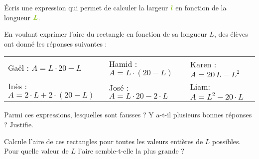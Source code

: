 \begin{activite}
\begin{partie}
Écris une expression qui permet de calculer la largeur $\emph{\textbf{\textcolor{H1}{l}}}$ en fonction de la longueur $\emph{\textbf{\textcolor{H1}{L}}}$.
\end{partie}

\begin{partie}
En voulant exprimer l'aire du rectangle en fonction de sa longueur $L$, des élèves ont donné les réponses suivantes :
\begin{center}
 \begin{tabularx}{1.1\linewidth}{X|X|X}
  Gaël : $A = L \cdot 20 - L$ & Hamid : $A = L \cdot (20 - L)$ & Karen : $A = 20\,L - L^2$ \\
  Inès : $A = 2 \cdot L + 2 \cdot (20 - L)$ & José : $A = L \cdot 20 - 2 \cdot L$ & Liam: $A = L^2 - 20 \cdot L$ \\
  \end{tabularx}   
 \end{center}
 \vspace{0.3cm}
Parmi ces expressions, lesquelles sont fausses ? Y a-t-il plusieurs bonnes réponses ? Justifie.
\end{partie}

\begin{partie}
Calcule l'aire de ces rectangles pour toutes les valeurs entières de $L$ possibles. Pour quelle valeur de $L$ l'aire semble-t-elle la plus grande ?
\end{partie}

\end{activite}
